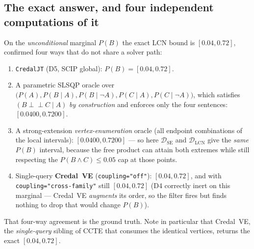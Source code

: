 \documentclass[11pt]{article}
\newcommand{\indep}{\perp\!\!\!\perp}
\newcommand{\DSE}{\mathcal{D}_{\mathrm{SE}}}
\newcommand{\DLCN}{\mathcal{D}_{\mathrm{LCN}}}
\begin{document}
\subsection{The exact answer, and four independent computations of it}
On the \emph{unconditional} marginal $P(B)$ the exact LCN bound is $[0.04,0.72]$, confirmed four
ways that do not share a solver path:
\begin{enumerate}\itemsep1pt
  \item \texttt{CredalJT} (D5, SCIP global): $P(B)=[0.04,0.72]$.
  \item A parametric SLSQP oracle over $\bigl(P(A),P(B\mid A),P(B\mid\lnot
    A),P(C\mid A),P(C\mid\lnot A)\bigr)$, which satisfies $(B\indep C\mid A)$ \emph{by
    construction} and enforces only the four sentences: $[0.0400,0.7200]$.
  \item A strong-extension \emph{vertex-enumeration} oracle (all endpoint combinations of the
    local intervals): $[0.0400,0.7200]$ --- so here $\DSE$ and $\DLCN$ give the \emph{same}
    $P(B)$ interval, because the free product can attain both extremes while still respecting the
    $P(B\land C)\le0.05$ cap at those points.
  \item Single-query \textbf{Credal~VE} (\texttt{coupling="off"}): $[0.04,0.72]$, and with
    \texttt{coupling="cross-family"} still $[0.04,0.72]$ (D4 correctly inert on this marginal ---
    Credal~VE \emph{augments} its order, so the filter fires but finds nothing to drop that would
    change $P(B)$).
\end{enumerate}
That four-way agreement is the ground truth. Note in particular that Credal~VE, the
\emph{single-query} sibling of CCTE that consumes the identical vertices, returns the exact
$[0.04,0.72]$.
\end{document}
